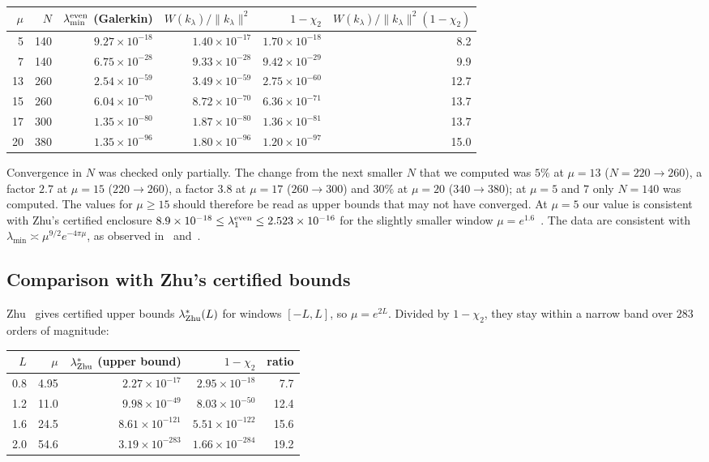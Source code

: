 \documentclass[11pt]{amsart}
\theoremstyle{definition}
\theoremstyle{remark}
\numberwithin{equation}{section}
\begin{document}
\begin{center}\small
\begin{tabular}{rrrrrr}
\toprule
$\mu$ & $N$ & $\lambda_{\min}^{\rm even}$ (Galerkin) & $W(k_\lambda)/\|k_\lambda\|^2$ & $1-\chi_2$ & $W(k_\lambda)/\|k_\lambda\|^2(1-\chi_2)$\\
\midrule
5 & 140 & $9.27\times10^{-18}$ & $1.40\times10^{-17}$ & $1.70\times10^{-18}$ & 8.2\\
7 & 140 & $6.75\times10^{-28}$ & $9.33\times10^{-28}$ & $9.42\times10^{-29}$ & 9.9\\
13 & 260 & $2.54\times10^{-59}$ & $3.49\times10^{-59}$ & $2.75\times10^{-60}$ & 12.7\\
15 & 260 & $6.04\times10^{-70}$ & $8.72\times10^{-70}$ & $6.36\times10^{-71}$ & 13.7\\
17 & 300 & $1.35\times10^{-80}$ & $1.87\times10^{-80}$ & $1.36\times10^{-81}$ & 13.7\\
20 & 380 & $1.35\times10^{-96}$ & $1.80\times10^{-96}$ & $1.20\times10^{-97}$ & 15.0\\
\bottomrule
\end{tabular}
\end{center}

Convergence in $N$ was checked only partially. The change from the next smaller $N$ that we computed was $5\%$ at $\mu=13$ ($N=220\to260$), a factor $2.7$ at $\mu=15$ ($220\to260$), a factor $3.8$ at $\mu=17$ ($260\to300$) and $30\%$ at $\mu=20$ ($340\to380$); at $\mu=5$ and $7$ only $N=140$ was computed. The values for $\mu\ge15$ should therefore be read as upper bounds that may not have converged. At $\mu=5$ our value is consistent with Zhu's certified enclosure $8.9\times10^{-18}\le\lambda_1^{\rm even}\le2.523\times10^{-16}$ for the slightly smaller window $\mu=e^{1.6}$~\cite[Thm.~6.2]{Zhu26}. The data are consistent with $\lambda_{\min}\asymp\mu^{9/2}e^{-4\pi\mu}$, as observed in~\cite[Fig.~4]{CCM25} and~\cite[Fig.~1]{Connes26}.

\subsection{Comparison with Zhu's certified bounds}
Zhu~\cite[Table~3]{Zhu26} gives certified upper bounds $\lambda^*_{\rm Zhu}(L)$ for windows $[-L,L]$, so $\mu=e^{2L}$. Divided by $1-\chi_2$, they stay within a narrow band over $283$ orders of magnitude:

\begin{center}\small
\begin{tabular}{rrrrr}
\toprule
$L$ & $\mu$ & $\lambda^*_{\rm Zhu}$ (upper bound) & $1-\chi_2$ & ratio\\
\midrule
0.8 & 4.95 & $2.27\times10^{-17}$ & $2.95\times10^{-18}$ & 7.7\\
1.2 & 11.0 & $9.98\times10^{-49}$ & $8.03\times10^{-50}$ & 12.4\\
1.6 & 24.5 & $8.61\times10^{-121}$ & $5.51\times10^{-122}$ & 15.6\\
2.0 & 54.6 & $3.19\times10^{-283}$ & $1.66\times10^{-284}$ & 19.2\\
\bottomrule
\end{tabular}
\end{center}
\end{document}
